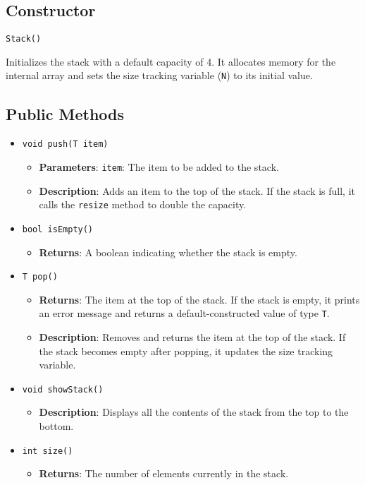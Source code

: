 \documentclass{article}
\begin{document}
\subsection{Constructor}
\begin{verbatim}
Stack()
\end{verbatim}
Initializes the stack with a default capacity of 4. It allocates memory for the internal array and sets the size tracking variable (\texttt{N}) to its initial value.

\subsection{Public Methods}
\begin{itemize}
    \item \texttt{void push(T item)}
    \begin{itemize}
        \item \textbf{Parameters}: \texttt{item}: The item to be added to the stack.
        \item \textbf{Description}: Adds an item to the top of the stack. If the stack is full, it calls the \texttt{resize} method to double the capacity.
    \end{itemize}

    \item \texttt{bool isEmpty()}
    \begin{itemize}
        \item \textbf{Returns}: A boolean indicating whether the stack is empty.
    \end{itemize}

    \item \texttt{T pop()}
    \begin{itemize}
        \item \textbf{Returns}: The item at the top of the stack. If the stack is empty, it prints an error message and returns a default-constructed value of type \texttt{T}.
        \item \textbf{Description}: Removes and returns the item at the top of the stack. If the stack becomes empty after popping, it updates the size tracking variable.
    \end{itemize}

    \item \texttt{void showStack()}
    \begin{itemize}
        \item \textbf{Description}: Displays all the contents of the stack from the top to the bottom.
    \end{itemize}

    \item \texttt{int size()}
    \begin{itemize}
        \item \textbf{Returns}: The number of elements currently in the stack.
    \end{itemize}
\end{itemize}
\end{document}
